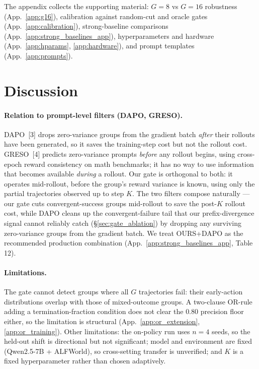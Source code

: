 \documentclass{article}
\begin{document}
The appendix collects the supporting material:
$G\!=\!8$ vs $G\!=\!16$ robustness (App.~\ref{app:g16}),
calibration against random-cut and oracle gates
(App.~\ref{app:calibration}),
strong-baseline comparisons (App.~\ref{app:strong_baselines_app}),
hyperparameters and hardware
(App.~\ref{app:hparams}, \ref{app:hardware}), and prompt templates
(App.~\ref{app:prompts}).


\section{Discussion}
\label{sec:discussion}

\paragraph{Relation to prompt-level filters (DAPO, GRESO).}
DAPO~[3] drops zero-variance groups from the gradient batch
\emph{after} their rollouts have been generated, so it saves the
training-step cost but not the rollout cost. GRESO~[4] predicts
zero-variance prompts \emph{before} any rollout begins, using
cross-epoch reward consistency on math benchmarks; it has no way
to use information that becomes available \emph{during} a
rollout. Our gate is orthogonal to both: it operates mid-rollout,
before the group's reward variance is known, using only the
partial trajectories observed up to step $K$. The two filters
compose naturally --- our gate cuts convergent-success groups
mid-rollout to save the post-$K$ rollout cost, while DAPO
cleans up the convergent-failure tail that our prefix-divergence
signal cannot reliably catch (\S\ref{sec:gate_ablation}) by
dropping any surviving zero-variance groups from the gradient
batch. We treat OURS+DAPO as the recommended production
combination (App.~\ref{app:strong_baselines_app}, Table 12).

\paragraph{Limitations.}
The gate cannot detect groups where all $G$ trajectories fail:
their early-action distributions overlap with those of
mixed-outcome groups. A two-clause OR-rule adding a
termination-fraction condition does not clear the $0.80$
precision floor either, so the limitation is structural
(App.~\ref{app:or_extension}, \ref{app:or_training}). Other
limitations: the on-policy run uses $n\!=\!4$ seeds, so the
held-out shift is directional but not significant; model and
environment are fixed (Qwen2.5-7B + ALFWorld), so cross-setting
transfer is unverified; and $K$ is a fixed hyperparameter rather
than chosen adaptively.
\end{document}
